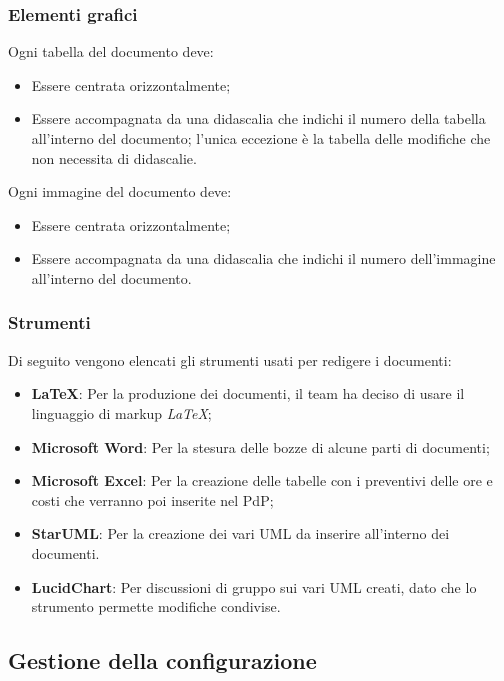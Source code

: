 \subsubsection{Elementi grafici}

Ogni tabella del documento deve:
\begin {itemize}
\item Essere centrata orizzontalmente;
\item Essere accompagnata da una didascalia che indichi il numero della tabella all'interno del documento; l'unica eccezione è la tabella delle modifiche che non necessita di didascalie.
\end {itemize}

Ogni immagine del documento deve:
\begin {itemize}
\item Essere centrata orizzontalmente;
\item Essere accompagnata da una didascalia che indichi il numero dell'immagine all'interno del documento.
\end {itemize}

\subsubsection{Strumenti}
Di seguito vengono elencati gli strumenti usati per redigere i documenti:
\begin {itemize}
\item \textbf{\LaTeX}: Per la produzione dei documenti, il team ha deciso di usare il linguaggio di markup \textit{\LaTeX};
\item \textbf{Microsoft Word}: Per la stesura delle bozze di alcune parti di documenti;
\item \textbf{Microsoft Excel}: Per la creazione delle tabelle con i preventivi delle ore e costi che verranno poi inserite nel PdP;
\item \textbf{StarUML}: Per la creazione dei vari UML da inserire all'interno dei documenti.
\item \textbf{LucidChart}: Per discussioni di gruppo sui vari UML creati, dato che lo strumento permette modifiche condivise.
\end {itemize}


\subsection{Gestione della configurazione}

